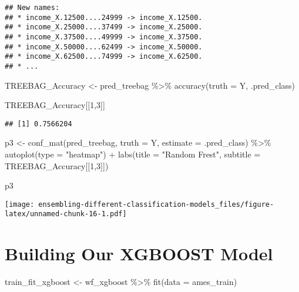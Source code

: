 \documentclass[
]{article}
\newenvironment{Shaded}{\begin{snugshade}}{\end{snugshade}}
\newcommand{\AttributeTok}[1]{\textcolor[rgb]{0.77,0.63,0.00}{#1}}
\newcommand{\DecValTok}[1]{\textcolor[rgb]{0.00,0.00,0.81}{#1}}
\newcommand{\FunctionTok}[1]{\textcolor[rgb]{0.00,0.00,0.00}{#1}}
\newcommand{\NormalTok}[1]{#1}
\newcommand{\OtherTok}[1]{\textcolor[rgb]{0.56,0.35,0.01}{#1}}
\newcommand{\SpecialCharTok}[1]{\textcolor[rgb]{0.00,0.00,0.00}{#1}}
\newcommand{\StringTok}[1]{\textcolor[rgb]{0.31,0.60,0.02}{#1}}
\begin{document}
\begin{verbatim}
## New names:
## * income_X.12500....24999 -> income_X.12500.
## * income_X.25000....37499 -> income_X.25000.
## * income_X.37500....49999 -> income_X.37500.
## * income_X.50000....62499 -> income_X.50000.
## * income_X.62500....74999 -> income_X.62500.
## * ...
\end{verbatim}

\begin{Shaded}
\begin{Highlighting}[]
\NormalTok{TREEBAG\_Accuracy }\OtherTok{\textless{}{-}}\NormalTok{ pred\_treebag }\SpecialCharTok{\%\textgreater{}\%} 
  \FunctionTok{accuracy}\NormalTok{(}\AttributeTok{truth =}\NormalTok{ Y, .pred\_class)}

\NormalTok{TREEBAG\_Accuracy[[}\DecValTok{1}\NormalTok{,}\DecValTok{3}\NormalTok{]]}
\end{Highlighting}
\end{Shaded}

\begin{verbatim}
## [1] 0.7566204
\end{verbatim}

\begin{Shaded}
\begin{Highlighting}[]
\NormalTok{p3 }\OtherTok{\textless{}{-}} \FunctionTok{conf\_mat}\NormalTok{(pred\_treebag, }\AttributeTok{truth =}\NormalTok{ Y, }\AttributeTok{estimate =}\NormalTok{ .pred\_class) }\SpecialCharTok{\%\textgreater{}\%} 
  \FunctionTok{autoplot}\NormalTok{(}\AttributeTok{type =} \StringTok{"heatmap"}\NormalTok{) }\SpecialCharTok{+}
  \FunctionTok{labs}\NormalTok{(}\AttributeTok{title =} \StringTok{"Random Frest"}\NormalTok{,}
       \AttributeTok{subtitle =}\NormalTok{ TREEBAG\_Accuracy[[}\DecValTok{1}\NormalTok{,}\DecValTok{3}\NormalTok{]])}

\NormalTok{p3}
\end{Highlighting}
\end{Shaded}

\texttt{[image: ensembling-different-classification-models\_files/figure-latex/unnamed-chunk-16-1.pdf]}

\hypertarget{building-our-xgboost-model}{%
\section{Building Our XGBOOST Model}\label{building-our-xgboost-model}}

\begin{Shaded}
\begin{Highlighting}[]
\NormalTok{train\_fit\_xgboost }\OtherTok{\textless{}{-}} 
\NormalTok{  wf\_xgboost }\SpecialCharTok{\%\textgreater{}\%} 
  \FunctionTok{fit}\NormalTok{(}\AttributeTok{data =}\NormalTok{ ames\_train)}
\end{Highlighting}
\end{Shaded}
\end{document}

